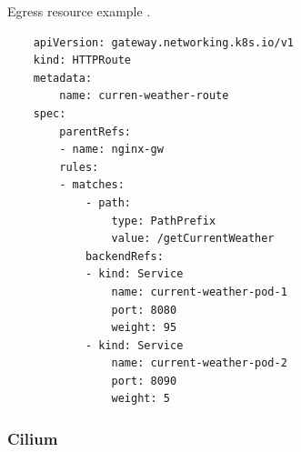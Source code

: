 \begin{listing}[htb]
    \centering
    \caption{Egress resource example \cite{AntreaEgressArch}.}
    \begin{verbatim}
    apiVersion: gateway.networking.k8s.io/v1
    kind: HTTPRoute
    metadata:
        name: curren-weather-route
    spec:
        parentRefs:
        - name: nginx-gw
        rules:
        - matches:
            - path:
                type: PathPrefix
                value: /getCurrentWeather
            backendRefs:
            - kind: Service
                name: current-weather-pod-1
                port: 8080
                weight: 95
            - kind: Service
                name: current-weather-pod-2
                port: 8090
                weight: 5
    \end{verbatim}
    \label{lst:yamlAntreaIngressCanaryHTTPRoute}
\end{listing}
\subsubsection{Cilium}
\label{subsection:ciliumIngress}

